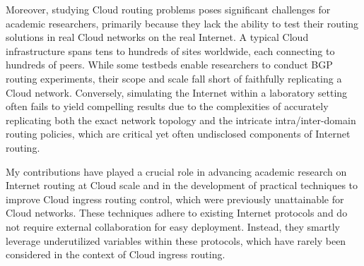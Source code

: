 \documentclass[sigconf,nonacm,screen,letterpaper,10pt]{acmart}
\begin{document}
Moreover, studying Cloud routing problems poses significant challenges
for academic researchers, primarily because they lack the ability to
test their routing solutions in real Cloud networks on the real
Internet. A typical Cloud infrastructure spans tens to hundreds of sites
worldwide, each connecting to hundreds of peers. While some testbeds
enable researchers to conduct BGP routing experiments, their scope and
scale fall short of faithfully replicating a Cloud network. Conversely,
simulating the Internet within a laboratory setting often fails to yield
compelling results due to the complexities of accurately replicating
both the exact network topology and the intricate intra/inter-domain
routing policies, which are critical yet often undisclosed components of
Internet routing.

My contributions have played a crucial role in advancing academic
research on Internet routing at Cloud scale and in the development of
practical techniques to improve Cloud ingress routing control, which
were previously unattainable for Cloud networks. These techniques adhere
to existing Internet protocols and do not require external collaboration
for easy deployment. Instead, they smartly leverage underutilized
variables within these protocols, which have rarely been considered in
the context of Cloud ingress routing.
\end{document}
